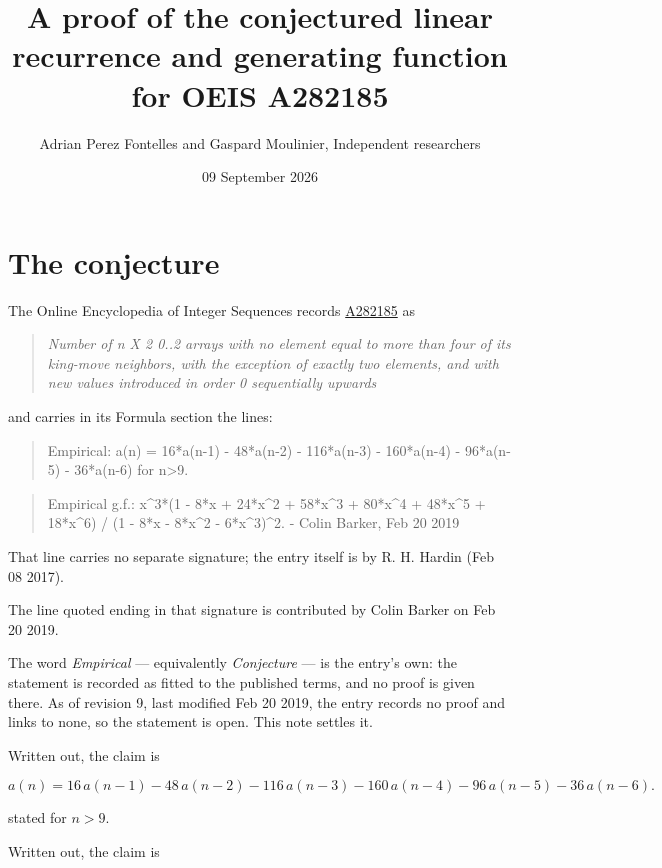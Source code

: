 \documentclass[11pt]{article}
\title{A proof of the conjectured linear recurrence and generating function for OEIS A282185}
\author{Adrian Perez Fontelles and Gaspard Moulinier, Independent researchers}
\date{09 September 2026}
\theoremstyle{definition}
\begin{document}
\maketitle
\section{The conjecture}

The Online Encyclopedia of Integer Sequences records \href{https://oeis.org/A282185}{A282185} as

\begin{quote}\itshape Number of n X 2 0..2 arrays with no element equal to more than four of its king-move neighbors, with the exception of exactly two elements, and with new values introduced in order 0 sequentially upwards\end{quote}

and carries in its Formula section the lines:

\begin{quote}\ttfamily Empirical: a(n) = 16*a(n-1) - 48*a(n-2) - 116*a(n-3) - 160*a(n-4) - 96*a(n-5) - 36*a(n-6) for n>9.\end{quote}

\begin{quote}\ttfamily Empirical g.f.: x\textasciicircum{}3*(1 - 8*x + 24*x\textasciicircum{}2 + 58*x\textasciicircum{}3 + 80*x\textasciicircum{}4 + 48*x\textasciicircum{}5 + 18*x\textasciicircum{}6) / (1 - 8*x - 8*x\textasciicircum{}2 - 6*x\textasciicircum{}3)\textasciicircum{}2. - Colin Barker, Feb 20 2019\end{quote}

That line carries no separate signature; the entry itself is by R. H. Hardin (Feb 08 2017).

The line quoted ending in that signature is contributed by Colin Barker on Feb 20 2019.

The word {\itshape Empirical} --- equivalently {\itshape Conjecture} --- is the entry's own: the statement is recorded as fitted to the published terms, and no proof is given there. As of revision 9, last modified Feb 20 2019, the entry records no proof and links to none, so the statement is open. This note settles it.

Written out, the claim is

\[a(n) = 16\,a(n-1) - 48\,a(n-2) - 116\,a(n-3) - 160\,a(n-4) - 96\,a(n-5) - 36\,a(n-6).\]

stated for $n > 9$.

Written out, the claim is
\end{document}
